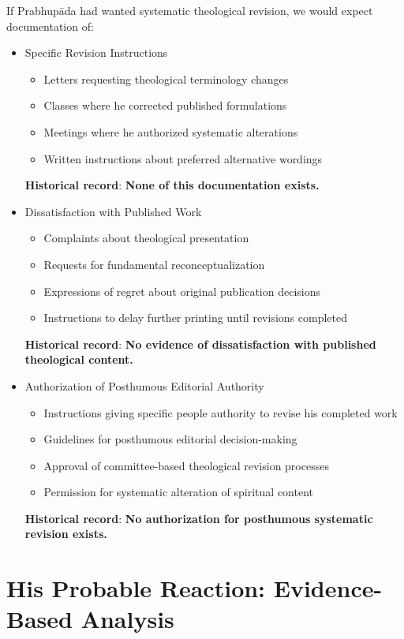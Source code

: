 \documentclass[11pt,twoside]{book}
\begin{document}
If Prabhupāda had wanted systematic theological revision, we would expect documentation of:
\begin{itemize}
\item Specific Revision Instructions
\label{sec:org2d60e9e}
\begin{itemize}
\item Letters requesting theological terminology changes
\item Classes where he corrected published formulations
\item Meetings where he authorized systematic alterations
\item Written instructions about preferred alternative wordings
\end{itemize}

\textbf{\textbf{Historical record}}: \textbf{\textbf{None of this documentation exists.}}
\item Dissatisfaction with Published Work
\label{sec:orgd960fab}
\begin{itemize}
\item Complaints about theological presentation
\item Requests for fundamental reconceptualization
\item Expressions of regret about original publication decisions
\item Instructions to delay further printing until revisions completed
\end{itemize}

\textbf{\textbf{Historical record}}: \textbf{\textbf{No evidence of dissatisfaction with published theological content.}}
\item Authorization of Posthumous Editorial Authority
\label{sec:org2d1e18a}
\begin{itemize}
\item Instructions giving specific people authority to revise his completed work
\item Guidelines for posthumous editorial decision-making
\item Approval of committee-based theological revision processes
\item Permission for systematic alteration of spiritual content
\end{itemize}

\textbf{\textbf{Historical record}}: \textbf{\textbf{No authorization for posthumous systematic revision exists.}}
\end{itemize}
\section*{His Probable Reaction: Evidence-Based Analysis}
\label{sec:org6b458f3}
\end{document}
